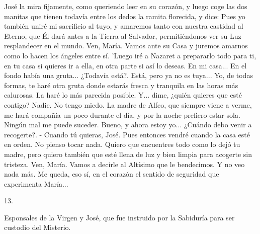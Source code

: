 \documentclass[12pt]{book} %
\begin{document}
José la mira fijamente, como queriendo leer en su corazón, y luego coge las dos manitas que tienen todavía entre los 
dedos la ramita florecida, y dice: 
Pues yo también uniré mi sacrificio al tuyo, y amaremos tanto con nuestra castidad al Eterno, que Él dará antes a la Tierra al Salvador, permitiéndonos ver su Luz resplandecer en el mundo. Ven, María. Vamos ante su Casa y juremos amarnos como lo hacen los ángeles entre sí. 'Luego iré a Nazaret a prepararlo todo para ti, en tu casa si quieres ir a ella, en otra parte si así lo deseas. 
En mi casa... En el fondo había una gruta... ¿Todavía está?. 
Está, pero ya no es tuya... Yo, de todas formas, te haré otra gruta donde estarás fresca y tranquila en las horas más 
calurosas. La haré lo más parecida posible. Y... dime, ¿quién quieres que esté contigo? 
Nadie. No tengo miedo. La madre de Alfeo, que siempre viene a verme, me hará compañía un poco durante el día, y 
por la noche prefiero estar sola. Ningún mal me puede suceder. 
Bueno, y ahora estoy yo... ¿Cuándo debo venir a recogerte?. - Cuando tú quieras, José. 
Pues entonces vendré cuando la casa esté en orden. No pienso tocar nada. Quiero que encuentres todo como lo dejó tu madre, pero quiero también que esté llena de luz y bien limpia para acogerte sin tristeza. Ven, María. Vamos a decirle al Altísimo que le bendecimos. 
Y no veo nada más. Me queda, eso sí, en el corazón el sentido de seguridad que experimenta María... 
 
13. 
 
Esponsales de la Virgen y José, que fue instruido por la Sabiduría para ser custodio del Misterio. 
 
\end{document}

